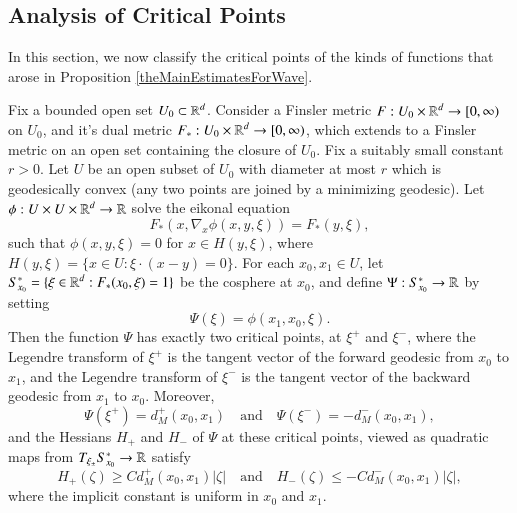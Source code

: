 \subsection{Analysis of Critical Points} \label{critpointsection}

In this section, we now classify the critical points of the kinds of functions that arose in Proposition \ref{theMainEstimatesForWave}.

\pagebreak[3]

\begin{prop} \label{triangleLemma}
    Fix a bounded open set $U_0 \subset \operatorname{\mathbb{R}}^d$. Consider a Finsler metric $F: U_0 \times \operatorname{\mathbb{R}}^d \to [0,\infty)$ on $U_0$, and it's dual metric $F_*: U_0 \times \operatorname{\mathbb{R}}^d \to [0,\infty)$, which extends to a Finsler metric on an open set containing the closure of $U_0$. Fix a suitably small constant $r > 0$. Let $U$ be an open subset of $U_0$ with diameter at most $r$ which is geodesically convex (any two points are joined by a minimizing geodesic). Let $\phi: U \times U \times \operatorname{\mathbb{R}}^d \to \operatorname{\mathbb{R}}$ solve the eikonal equation
    \begin{equation} \label{eikonalequation}
        F_* ( x, \nabla_x \phi(x,y,\xi) ) = F_*(y,\xi),
    \end{equation}
    such that $\phi(x,y,\xi) = 0$ for $x \in H(y,\xi)$, where $H(y, \xi) = \{ x \in U : \xi \cdot (x - y) = 0 \}$. For each $x_0,x_1 \in U$, let $S_{x_0}^* = \{ \xi \in \operatorname{\mathbb{R}}^d: F_*(x_0,\xi) = 1 \}$ be the cosphere at $x_0$, and define $\Psi: S_{x_0}^* \to \operatorname{\mathbb{R}}$ by setting
    \begin{equation}
        \Psi(\xi) = \phi(x_1,x_0,\xi).
    \end{equation}
    Then the function $\Psi$ has exactly two critical points, at $\xi^+$ and $\xi^-$, where the Legendre transform of $\xi^+$ is the tangent vector of the forward geodesic from $x_0$ to $x_1$, and the Legendre transform of $\xi^-$ is the tangent vector of the backward geodesic from $x_1$ to $x_0$. Moreover,
    \begin{equation}
        \Psi(\xi^+) = d_M^+(x_0,x_1) \quad\text{and}\quad \Psi(\xi^-) = - d_M^-(x_0,x_1),
    \end{equation}
    and the Hessians $H_+$ and $H_-$ of $\Psi$ at these critical points, viewed as quadratic maps from $T_{\xi_{\pm}} S_{x_0}^* \to \operatorname{\mathbb{R}}$ satisfy
    \begin{equation}
        H_+(\zeta) \geq C d_M^+(x_0,x_1) |\zeta| \quad\text{and}\quad H_-(\zeta) \leq - C d_M^-(x_0,x_1) |\zeta|,
    \end{equation}
    where the implicit constant is uniform in $x_0$ and $x_1$.
\end{prop}


